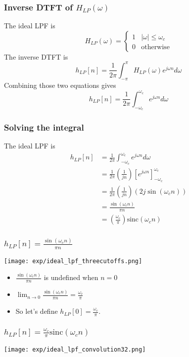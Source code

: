 \documentclass{beamer}
\begin{document}
\begin{frame}
  \frametitle{Inverse DTFT of $H_{LP}(\omega)$}

  The ideal LPF is
  \[
  H_{LP}(\omega)
  = \begin{cases} 1& |\omega|\le\omega_c\\
    0 & \mbox{otherwise}
  \end{cases}
  \]
  The inverse DTFT is
  \[
  h_{LP}[n] = \frac{1}{2\pi}\int_{-\pi}^\pi H_{LP}(\omega)e^{j\omega n}d\omega
  \]
  Combining those two equations gives
  \[
  h_{LP}[n] = \frac{1}{2\pi}\int_{-\omega_c}^{\omega_c}e^{j\omega n}d\omega
  \]
\end{frame}

\begin{frame}
  \frametitle{Solving the integral}

  The ideal LPF is
  \begin{align*}
    h_{LP}[n] &= \frac{1}{2\pi}\int_{-\omega_c}^{\omega_c}e^{j\omega n}d\omega\\
    &= \frac{1}{2\pi}\left(\frac{1}{jn}\right)\left[e^{j\omega n}\right]_{-\omega_c}^{\omega_c}\\
    &= \frac{1}{2\pi}\left(\frac{1}{jn}\right)\left(2j\sin(\omega_c n)\right)\\
    &= \frac{\sin(\omega_c n)}{\pi n}\\
    &= \left(\frac{\omega_c}{\pi}\right)\mbox{sinc}(\omega_c n)
  \end{align*}
\end{frame}

\begin{frame}
  \frametitle{$h_{LP}[n]=\frac{\sin(\omega_c n)}{\pi n}$}

  \centerline{\texttt{[image: exp/ideal\_lpf\_threecutoffs.png]}}
  \begin{itemize}
  \item $\frac{\sin(\omega_c n)}{\pi n}$ is undefined when $n=0$
  \item $\lim_{n\rightarrow 0}\frac{\sin(\omega_c n)}{\pi n}=\frac{\omega_c}{\pi}$
  \item So let's define $h_{LP}[0]=\frac{\omega_c}{\pi}$.
  \end{itemize}
\end{frame}



\begin{frame}
  \frametitle{$h_{LP}[n]=\frac{\omega_c}{\pi}\mbox{sinc}(\omega_c n)$}

  \centerline{\texttt{[image: exp/ideal\_lpf\_convolution32.png]}}
\end{frame}
\end{document}
